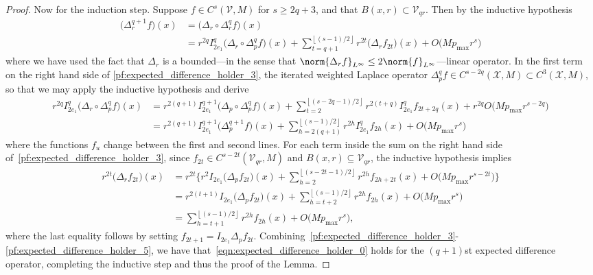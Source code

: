 \documentclass{article}
\newcommand{\floor}[1]{\left\lfloor #1 \right\rfloor}
\newcommand{\1}{\mathbf{1}}
\newcommand{\Xset}{\mathcal{X}}
\newcommand{\Vset}{\mathcal{V}}
\newcommand{\Leb}{L}
\theoremstyle{alden}
\theoremstyle{aldenthm}
\theoremstyle{definition}
\theoremstyle{remark}
\begin{document}
\begin{proof}
	Now for the induction step. Suppose $f \in C^s(\Vset,M)$ for $s \geq 2q + 3$, and that $B(x,r) \subset \Vset_{qr}$. Then by the inductive hypothesis
	\begin{align}
	\bigl(\Delta_r^{q + 1}f\bigr)(x) & = \bigl(\Delta_r \circ \Delta_r^qf)(x) \nonumber \\
	& = r^{2q} I_{2e_1}^q \bigl(\Delta_r \circ \Delta_p^q f\bigr)(x) + \sum_{t = q + 1}^{\floor{(s - 1)/2}} r^{2t} \bigl(\Delta_rf_{2t}\bigr)(x) + O\bigl(M p_{\max}r^s\bigr) \label{pf:expected_difference_holder_3}
	\end{align}
	where we have used the fact that $\Delta_r$ is a bounded---in the sense that $\norm{\Delta_r f}_{\Leb^{\infty}} \leq 2 \norm{f}_{\Leb^{\infty}}$---linear operator. In the first term on the right hand side of \eqref{pf:expected_difference_holder_3}, the iterated weighted Laplace operator $\Delta_p^qf \in C^{s - 2q}(\Xset,M) \subset C^3(\Xset,M)$, so that we may apply the inductive hypothesis and derive
	\begin{align}
	r^{2q} I_{2e_1}^q \bigl(\Delta_r \circ \Delta_p^q f\bigr)(x) & = r^{2(q + 1)} I_{2e_1}^{q + 1} \bigl(\Delta_p \circ \Delta_p^{q}f\bigr)(x) + \sum_{t = 2}^{\floor{(s - 2q - 1)/2}} r^{2(t + q)} I_{2e_1}^q f_{2t + 2q}(x) + r^{2q}O\bigl(Mp_{\max}r^{s - 2q}\bigr) \nonumber \\ 
	& = r^{2(q + 1)} I_{2e_1}^{q + 1} \bigl(\Delta_p^{q + 1}f\bigr)(x) + \sum_{h = 2(q + 1)}^{\floor{(s - 1)/2}} r^{2h} I_{2e_1}^q f_{2h}(x) + O\bigl(Mp_{\max}r^{s}\bigr) \label{pf:expected_difference_holder_4}
	\end{align}
	where the functions $f_u$ change between the first and second lines. For each term inside the sum on the right hand side of~\eqref{pf:expected_difference_holder_3}, since $f_{2t} \in C^{s - 2t}(\Vset_{qr},M)$ and $B(x,r) \subseteq \Vset_{qr}$, the inductive hypothesis implies
	\begin{align}
	r^{2t} \bigl(\Delta_rf_{2t}\bigr)(x) & = r^{2t}\biggl\{ r^2 I_{2e_1} \bigl(\Delta_pf_{2t}\bigr)(x) + \sum_{h = 2}^{\floor{(s - 2t - 1)/2}} r^{2h}f_{2h + 2t}(x) + O\bigl(M p_{\max} r^{s - 2t}\bigr) \biggr\} \nonumber \\
	& = r^{2(t + 1)} I_{2e_1} \bigl(\Delta_pf_{2t}\bigr)(x) + \sum_{h = t + 2}^{\floor{(s - 1)/2}} r^{2h}f_{2h}(x) + O\bigl(M p_{\max} r^{s}\bigr) \nonumber \\
	& = \sum_{h = t + 1}^{\floor{(s - 1)/2}} r^{2h}f_{2h}(x) + O\bigl(M p_{\max} r^{s}\bigr),\label{pf:expected_difference_holder_5}
	\end{align}
	where the last equality follows by setting $f_{2{t + 1}} = I_{2e_1}\Delta_pf_{2t}$. 
	Combining~\eqref{pf:expected_difference_holder_3}-\eqref{pf:expected_difference_holder_5}, we have that~\eqref{eqn:expected_difference_holder_0} holds for the $(q + 1)$st expected difference operator, completing the inductive step and thus the proof of the Lemma.
\end{proof}
\end{document}
